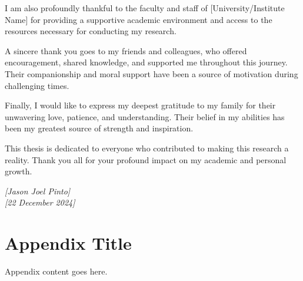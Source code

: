 \documentclass[12pt,twocolumn]{report}
\begin{document}
I am also profoundly thankful to the faculty and staff of [University/Institute Name] for providing a supportive academic environment and access to the resources necessary for conducting my research. 

A sincere thank you goes to my friends and colleagues, who offered encouragement, shared knowledge, and supported me throughout this journey. Their companionship and moral support have been a source of motivation during challenging times.

Finally, I would like to express my deepest gratitude to my family for their unwavering love, patience, and understanding. Their belief in my abilities has been my greatest source of strength and inspiration. 

This thesis is dedicated to everyone who contributed to making this research a reality. Thank you all for your profound impact on my academic and personal growth.

\begin{flushright}
\textit{[Jason Joel Pinto]} \\
\textit{[22 December 2024]}
\end{flushright}

\appendix
\chapter{Appendix Title}
Appendix content goes here.

\cleardoublepage
\printbibliography
\end{document}
